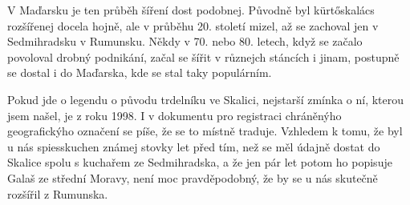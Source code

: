 V Maďarsku je ten průběh šíření dost podobnej. Původně byl kürtőskalács
rozšířenej docela hojně, ale v průběhu 20. století mizel, až se zachoval jen v
Sedmihradsku v Rumunsku. Někdy v 70. nebo 80. letech, když se začalo povoloval
drobný podnikání, začal se šířit v různejch stáncích i jinam, postupně se
dostal i do Maďarska, kde se stal taky populárním.

Pokud jde o legendu o původu trdelníku ve Skalici, nejstarší zmínka o ní,
kterou jsem našel, je z roku 1998. I v dokumentu pro registraci chráněnýho
geografickýho označení se píše, že se to místně traduje. Vzhledem k tomu, že
byl u nás spiesskuchen známej stovky let před tím, než se měl údajně dostat do
Skalice spolu s kuchařem ze Sedmihradska, a že jen pár let potom ho popisuje
Galaš ze střední Moravy, není moc pravděpodobný, že by se u nás skutečně
rozšířil z Rumunska.

